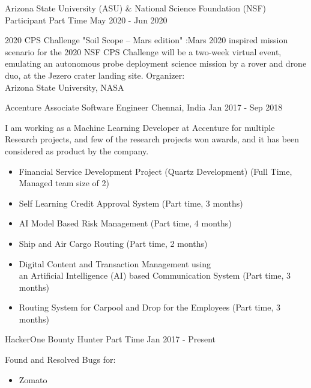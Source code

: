 \begin{cventries}
	\cventry
	{Arizona State University (ASU) \& National Science Foundation (NSF)}
	{Participant}
	{Part Time}
	{May 2020 - Jun 2020}
	{\begin{flushleft}
			2020 CPS Challenge "Soil Scope -- Mars edition" :\newline Mars 2020 inspired mission scenario for the 2020 NSF CPS Challenge will be a two-week virtual event, emulating an autonomous probe deployment science mission by a rover and drone duo, at the Jezero crater landing site.\newline
			Organizer:\\
			Arizona State University, NASA
		\end{flushleft}}


	
	\cventry
	{Accenture}
	{Associate Software Engineer}
	{Chennai, India}
	{Jan 2017 - Sep 2018}
	{	\begin{flushleft}
			I am working as a Machine Learning Developer at Accenture for multiple Research projects, and few of the research projects won awards, and it has been considered as product by the company.
			\begin{itemize}
				\item Financial Service Development Project (Quartz Development) (Full Time, Managed team size of 2)
				\item Self Learning Credit Approval System (Part time, 3 months)
				\item AI Model Based Risk Management (Part time, 4 months)
				\item Ship and Air Cargo Routing (Part time, 2 months)
				\item Digital Content and Transaction Management using\\ an Artificial Intelligence (AI) based Communication System (Part time, 3 months)
				\item Routing System for Carpool and Drop for the Employees (Part time, 3 months)
			\end{itemize}
		\end{flushleft}
	}

	\cventry
	{HackerOne}
	{Bounty Hunter}
	{Part Time}
	{Jan 2017 - Present}
	{
		\begin{flushleft}
			Found and Resolved Bugs for:
			\begin{itemize}
				\item {Zomato}
			\end{itemize}
		\end{flushleft}
	}


\end{cventries}
